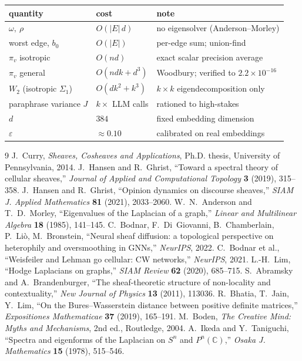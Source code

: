 \documentclass[11pt]{article}
\theoremstyle{definition}
\theoremstyle{plain}
\theoremstyle{remark}
\begin{document}
\begin{center}
\renewcommand{\arraystretch}{1.2}
\begin{tabular}{@{}lll@{}}
\hline
quantity & cost & note\\
\hline
$\omega,\ \rho$ & $O(|E|\,d)$ & no eigensolver (Anderson--Morley)\\
worst edge, $b_0$ & $O(|E|)$ & per-edge sum; union-find\\
$\pi_v$ isotropic & $O(nd)$ & exact scalar precision average\\
$\pi_v$ general & $O(ndk+d^3)$ & Woodbury; verified to $2.2\times10^{-16}$\\
$W_2$ (isotropic $\Sigma_1$) & $O(dk^2+k^3)$ & $k\times k$ eigendecomposition only\\
paraphrase variance $J$ & $k\times$ LLM calls & rationed to high-stakes\\
$d$ & $384$ & fixed embedding dimension\\
$\varepsilon$ & $\approx 0.10$ & calibrated on real embeddings\\
\hline
\end{tabular}
\end{center}

\begin{thebibliography}{9}
 J.~Curry, \emph{Sheaves, Cosheaves and Applications}, Ph.D. thesis, University of Pennsylvania, 2014.
 J.~Hansen and R.~Ghrist, ``Toward a spectral theory of cellular sheaves,'' \emph{Journal of Applied and Computational Topology} \textbf{3} (2019), 315--358.
 J.~Hansen and R.~Ghrist, ``Opinion dynamics on discourse sheaves,'' \emph{SIAM J. Applied Mathematics} \textbf{81} (2021), 2033--2060.
 W.~N.~Anderson and T.~D.~Morley, ``Eigenvalues of the Laplacian of a graph,'' \emph{Linear and Multilinear Algebra} \textbf{18} (1985), 141--145.
 C.~Bodnar, F.~Di~Giovanni, B.~Chamberlain, P.~Li\`o, M.~Bronstein, ``Neural sheaf diffusion: a topological perspective on heterophily and oversmoothing in GNNs,'' \emph{NeurIPS}, 2022.
 C.~Bodnar et al., ``Weisfeiler and Lehman go cellular: CW networks,'' \emph{NeurIPS}, 2021.
 L.-H.~Lim, ``Hodge Laplacians on graphs,'' \emph{SIAM Review} \textbf{62} (2020), 685--715.
 S.~Abramsky and A.~Brandenburger, ``The sheaf-theoretic structure of non-locality and contextuality,'' \emph{New Journal of Physics} \textbf{13} (2011), 113036.
 R.~Bhatia, T.~Jain, Y.~Lim, ``On the Bures--Wasserstein distance between positive definite matrices,'' \emph{Expositiones Mathematicae} \textbf{37} (2019), 165--191.
 M.~Boden, \emph{The Creative Mind: Myths and Mechanisms}, 2nd ed., Routledge, 2004.
 A.~Ikeda and Y.~Taniguchi, ``Spectra and eigenforms of the Laplacian on $S^n$ and $P^n(\mathbb{C})$,'' \emph{Osaka J. Mathematics} \textbf{15} (1978), 515--546.
\end{thebibliography}
\end{document}
